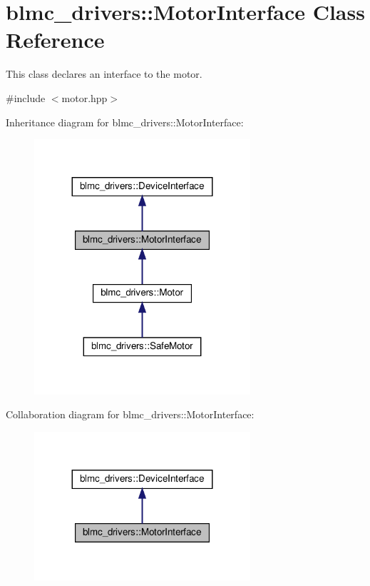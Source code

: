 \hypertarget{classblmc__drivers_1_1MotorInterface}{}\section{blmc\+\_\+drivers\+:\+:Motor\+Interface Class Reference}
\label{classblmc__drivers_1_1MotorInterface}


This class declares an interface to the motor.  




{\ttfamily \#include $<$motor.\+hpp$>$}



Inheritance diagram for blmc\+\_\+drivers\+:\+:Motor\+Interface\+:
\nopagebreak
\begin{figure}[H]
\begin{center}
\leavevmode
\includegraphics[width=227pt]{classblmc__drivers_1_1MotorInterface__inherit__graph}
\end{center}
\end{figure}


Collaboration diagram for blmc\+\_\+drivers\+:\+:Motor\+Interface\+:
\nopagebreak
\begin{figure}[H]
\begin{center}
\leavevmode
\includegraphics[width=227pt]{classblmc__drivers_1_1MotorInterface__coll__graph}
\end{center}
\end{figure}
